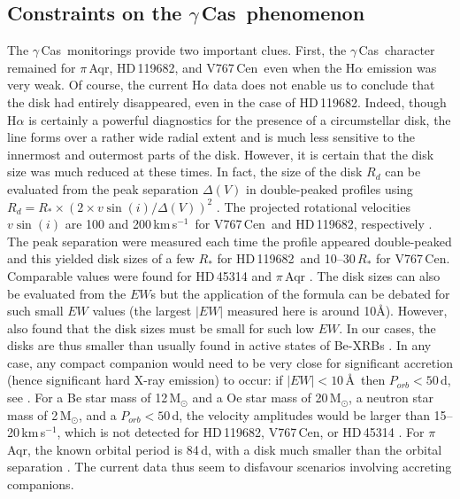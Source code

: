 \documentclass[a4paper,fleqn,usenatbib]{mnras}
\newcommand{\gc}{$\gamma$\,Cas}
\newcommand{\hd}{HD\,119682}
\newcommand{\vc}{V767\,Cen}
\newcommand{\kms}{km\,s$^{-1}$}
\begin{document}
\subsection{Constraints on the \gc\ phenomenon}
The \gc\ monitorings provide two important clues. First, the \gc\ character remained for $\pi$\,Aqr, \hd, and \vc\ even when the H$\alpha$ emission was very weak. Of course, the current H$\alpha$ data does not enable us to conclude that the disk had entirely disappeared, even in the case of \hd. Indeed, though H$\alpha$ is certainly a powerful diagnostics for the presence of a circumstellar disk, the line forms over a rather wide radial extent and is much less sensitive to the innermost and outermost parts of the disk. However, it is certain that the disk size was much reduced at these times. In fact, the size of the disk $R_d$ can be evaluated from the peak separation $\Delta(V)$ in double-peaked profiles using $R_d=R_*\times (2\times v \sin(i)/\Delta(V))^2$ \citep{hua72,hum95,zam19}. The projected rotational velocities $v \sin(i)$ are 100 and 200\,\kms\ for \vc\ and \hd, respectively \citep{zor16}. The peak separation were measured each time the profile appeared double-peaked and this yielded disk sizes of a few $R_*$ for \hd\ and 10--30\,$R_*$ for \vc. Comparable values were found for HD\,45314 \citep{rau18} and $\pi$\,Aqr \citep{naz19piaqr}. The disk sizes can also be evaluated from the $EW$s \citep[see Eq. (3) in][]{zam19} but the application of the formula can be debated for such small $EW$ values (the largest $|EW|$ measured here is around 10\AA). However, \citet{rei16} also found that the disk sizes must be small for such low $EW$. In our cases, the disks are thus smaller than usually found in active states of Be-XRBs \citep[see also Fig. 5 of][]{zam19}. In any case, any compact companion would need to be very close for significant accretion (hence significant hard X-ray emission) to occur: if $|EW|<10$\,\AA\ then $P_{orb}<50$\,d, see \citet{coe15}. For a Be star mass of 12\,M$_{\odot}$ and a Oe star mass of 20\,M$_{\odot}$, a neutron star mass of 2\,M$_{\odot}$, and a $P_{orb}<50$\,d, the velocity amplitudes would be larger than 15--20\,\kms, which is not detected for \hd, \vc, or HD\,45314 \citep{rau18,naz21}. For $\pi$\,Aqr, the known orbital period is 84\,d, with a disk much smaller than the orbital separation \citep[and references therein]{naz19piaqr}. The current data thus seem to disfavour scenarios involving accreting companions. 
\end{document}
